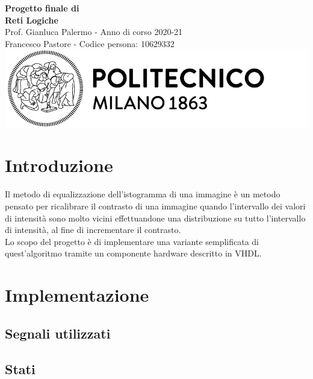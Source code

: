 \documentclass{article}
\begin{document}
\begin{titlepage}
    \centering
    \vspace*{\fill}
    \Huge\textbf{Progetto finale di \\ Reti Logiche}\\
    \vspace{5mm} %
    \Large Prof. Gianluca Palermo - Anno di corso 2020-21\\
    \vspace{5mm} %
    \large Francesco Pastore - Codice persona: 10629332\\
    \vspace{100mm}
    \includegraphics[scale=0.7]{logo.png}
    \vspace*{\fill}
\end{titlepage}

\tableofcontents
\pagebreak

\section{Introduzione}
\noindent
Il metodo di equalizzazione dell’istogramma di una immagine è un metodo pensato per
ricalibrare il contrasto di una immagine quando l’intervallo dei valori di intensità sono molto
vicini effettuandone una distribuzione su tutto l’intervallo di intensità, al fine di incrementare il
contrasto. \\
Lo scopo del progetto è di implementare una variante semplificata di quest'algoritmo tramite un componente hardware descritto in VHDL.

\section{Implementazione}

\subsection{Segnali utilizzati}
\subsection{Stati}
\end{document}
